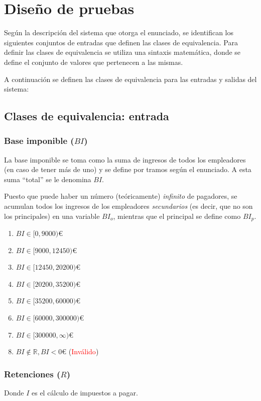\chapter{Diseño de pruebas}
Según la descripción del sistema que otorga el enunciado, se identifican los siguientes conjuntos de entradas
que definen las clases de equivalencia. Para definir las clases de equivalencia se utiliza una sintaxis
matemática, donde se define el conjunto de valores que pertenecen a las mismas.

A continuación se definen las clases de equivalencia para las entradas y salidas del sistema:

\section{Clases de equivalencia: entrada}
\subsection{Base imponible ($BI$)}
La base imponible se toma como la suma de ingresos de todos los empleadores
(en caso de tener más de uno) y se define por tramos según el enunciado.
A esta suma ``total'' se le denomina $BI$.

Puesto que puede haber un número (teóricamente) \textit{infinito} de pagadores,
se acumulan todos los ingresos de los empleadores \textit{secundarios} (es decir, que no
son los principales) en una variable $BI_{o}$, mientras que el principal se define como $BI_{p}$.

\begin{enumerate}
	\item $BI \in [0, 9000)$€
	\item $BI \in [9000, 12450)$€
	\item $BI \in [12450, 20200)$€
	\item $BI \in [20200, 35200)$€
	\item $BI \in [35200, 60000)$€
	\item $BI \in [60000, 300000)$€
	\item $BI \in [300000, \infty)$€
	\item $BI \notin \mathbb{R}, BI < 0$€ (\textcolor{red}{Inválido})
\end{enumerate}

\subsection{Retenciones ($R$)}
Donde $I$ es el cálculo de impuestos a pagar.

